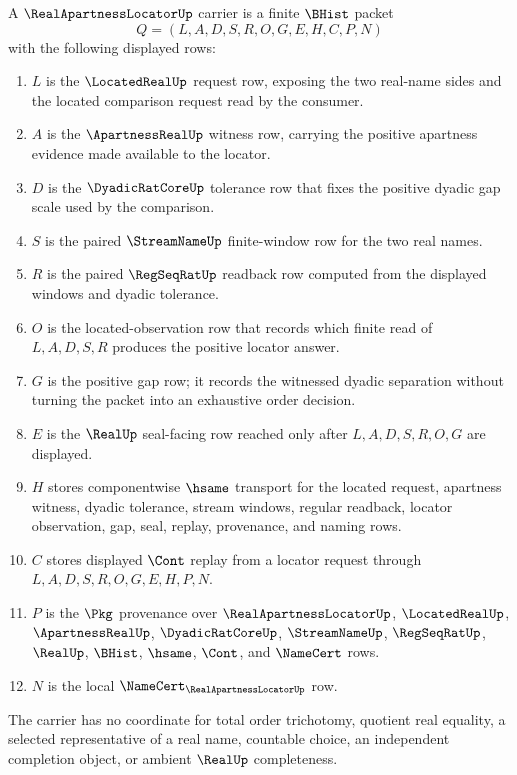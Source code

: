 \begin{definition}
\label{def:real-apartness-locator-carrier}
A $\RealApartnessLocatorUp$ carrier is a finite $\BHist$ packet
$$
Q=(L,A,D,S,R,O,G,E,H,C,P,N)
$$
with the following displayed rows:
\begin{enumerate}
\item $L$ is the $\LocatedRealUp$ request row, exposing the two real-name sides and the located comparison request read by the consumer.
\item $A$ is the $\ApartnessRealUp$ witness row, carrying the positive apartness evidence made available to the locator.
\item $D$ is the $\DyadicRatCoreUp$ tolerance row that fixes the positive dyadic gap scale used by the comparison.
\item $S$ is the paired $\StreamNameUp$ finite-window row for the two real names.
\item $R$ is the paired $\RegSeqRatUp$ readback row computed from the displayed windows and dyadic tolerance.
\item $O$ is the located-observation row that records which finite read of $L,A,D,S,R$ produces the positive locator answer.
\item $G$ is the positive gap row; it records the witnessed dyadic separation without turning the packet into an exhaustive order decision.
\item $E$ is the $\RealUp$ seal-facing row reached only after $L,A,D,S,R,O,G$ are displayed.
\item $H$ stores componentwise $\hsame$ transport for the located request, apartness witness, dyadic tolerance, stream windows, regular readback, locator observation, gap, seal, replay, provenance, and naming rows.
\item $C$ stores displayed $\Cont$ replay from a locator request through $L,A,D,S,R,O,G,E,H,P,N$.
\item $P$ is the $\Pkg$ provenance over $\RealApartnessLocatorUp$, $\LocatedRealUp$, $\ApartnessRealUp$, $\DyadicRatCoreUp$, $\StreamNameUp$, $\RegSeqRatUp$, $\RealUp$, $\BHist$, $\hsame$, $\Cont$, and $\NameCert$ rows.
\item $N$ is the local $\NameCert_{\RealApartnessLocatorUp}$ row.
\end{enumerate}
The carrier has no coordinate for total order trichotomy, quotient real equality, a selected representative of a real name, countable choice, an independent completion object, or ambient $\RealUp$ completeness.
\end{definition}

